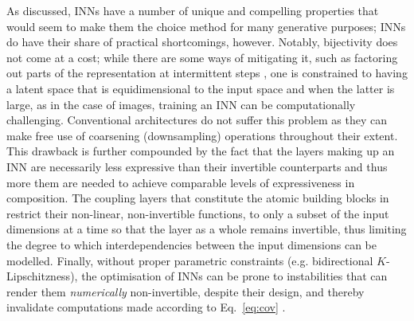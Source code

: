 %
As discussed, \acp{INN} have a number of unique and compelling properties that would seem to make them
the choice method for many generative purposes; \acp{INN} do have their share of practical
shortcomings, however. 
%
Notably, bijectivity does not come at a cost; while there are some ways of mitigating it, such as
factoring out parts of the representation at intermittent steps \citep{hoogeboom2019integer}, one
is constrained to having a latent space that is equidimensional to the input space and when the
latter is large, as in the case of images, training an \ac{INN} can be computationally challenging.
%
Conventional architectures do not suffer this problem as they can make free use of coarsening
(downsampling) operations throughout their extent.
%
This drawback is further compounded by the fact that the layers making up an \ac{INN} are necessarily
less expressive than their invertible counterparts and thus more them are needed to achieve
comparable levels of expressiveness in composition. 
%
The coupling layers that constitute the atomic building blocks in \cite{dinh2014nice} restrict
their non-linear, non-invertible functions, to only a subset of the input dimensions at a time so
that the layer as a whole remains invertible, thus limiting the degree to which interdependencies
between the input dimensions can be modelled.
%
Finally, without proper parametric constraints (e.g. bidirectional \(K\)-Lipschitzness), the
optimisation of \acp{INN} can be prone to instabilities that can render them \emph{numerically}
non-invertible, despite their design, and thereby invalidate computations made according to
Eq.~\ref{eq:cov} \citep{behrmann2021understanding}.

